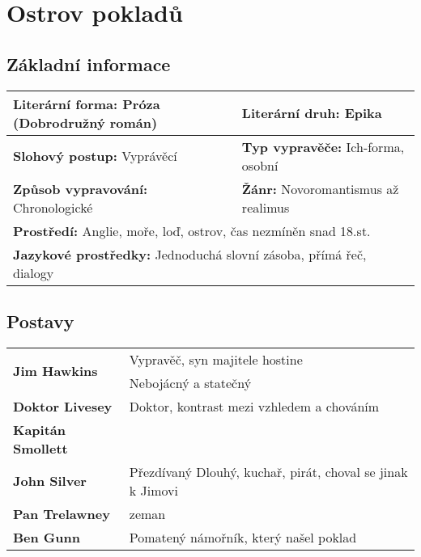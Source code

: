 \section{Ostrov pokladů}
\label{sec:ostrovpokladu}
\subsection*{Základní informace}
\begin{tabularx}{\linewidth}{l|l}
  \textbf{Literární forma:} Próza (Dobrodružný román) & \textbf{Literární druh:} Epika             \\
  \hline
  \textbf{Slohový postup:} Vyprávěcí                  & \textbf{Typ vypravěče:} Ich-forma, osobní  \\
  \hline
  \textbf{Způsob vypravování:} Chronologické          & \textbf{Žánr:} Novoromantismus až realimus \\
  \hline
  \multicolumn{2}{l}{\textbf{Prostředí:} Anglie, moře, loď, ostrov, čas nezmíněn snad 18.st.}      \\
  \hline
  \multicolumn{2}{l}{\textbf{Jazykové prostředky:} Jednoduchá slovní zásoba, přímá řeč, dialogy}   \\
\end{tabularx}
\subsection*{Postavy}
\begin{tabularx}{\linewidth}{l|l}
  \multirow{2}{15em}{\textbf{Jim Hawkins}} & Vypravěč, syn majitele hostine                             \\
                                           & Nebojácný a statečný                                       \\
  \hline
  \textbf{Doktor Livesey}                  & Doktor, kontrast mezi vzhledem a chováním                  \\
  \hline
  \textbf{Kapitán Smollett}                &                                                            \\
  \hline
  \textbf{John Silver}                     & Přezdívaný Dlouhý, kuchař, pirát, choval se jinak k Jimovi \\
  \hline
  \textbf{Pan Trelawney}                   & zeman                                                      \\
  \hline
  \textbf{Ben Gunn}                        & Pomatený námořník, který našel poklad                      \\
\end{tabularx}
